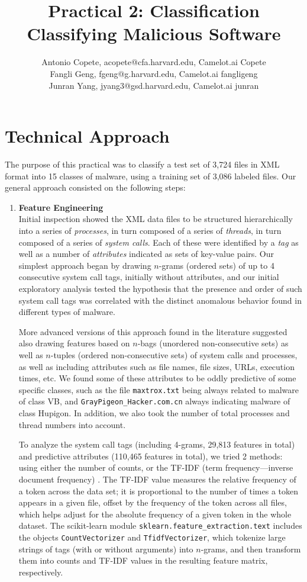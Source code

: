 \documentclass[11pt]{article}
\title{Practical 2: Classification\\ Classifying Malicious Software}
\author{Antonio Copete, acopete@cfa.harvard.edu, Camelot.ai Copete \\
	Fangli Geng, fgeng@g.harvard.edu, Camelot.ai fangligeng\\
	Junran Yang, jyang3@gsd.harvard.edu, Camelot.ai junran}
\begin{document}
\maketitle{}

\section{Technical Approach}

The purpose of this practical was to classify a test set of 3,724 files in XML format into 15 classes of malware, using a training set of 3,086 labeled files. Our general approach consisted on the following steps:

\begin{enumerate} %

\item \textbf{Feature Engineering}\\
Initial inspection showed the XML data files to be structured hierarchically into a series of \emph{processes}, in turn composed of a series of \emph{threads}, in turn composed of a series of \emph{system calls}. Each of these were identified by a \emph{tag} as well as a number of \emph{attributes} indicated as sets of key-value pairs. Our simplest approach began by drawing $n$-grams (ordered sets) of up to 4 consecutive system call tags, initially without attributes, and our initial exploratory analysis tested the hypothesis that the presence and order of such system call tags was correlated with the distinct anomalous behavior found in different types of malware.

More advanced versions of this approach found in the literature \cite{canali} suggested also drawing features based on $n$-bags (unordered non-consecutive sets) as well as $n$-tuples (ordered non-consecutive sets) of system calls and processes, as well as including attributes such as file names, file sizes, URLs, execution times, etc. We found some of these attributes to be oddly predictive of some specific classes, such as the file \verb|maxtrox.txt| being always related to malware of class VB, and \verb|GrayPigeon_Hacker.com.cn| always indicating malware of class Hupigon. In addition, we also took the number of total processes and thread numbers into account.

To analyze the system call tags (including 4-grams, 29,813 features in total) and predictive attributes (110,465 features in total), we tried 2 methods: using either the number of counts, or the TF-IDF (term frequency---inverse document frequency) \cite{canzanese}. The TF-IDF value measures the relative frequency of a token across the data set; it is proportional to the number of times a token appears in a given file, offset by the frequency of the token across all files, which helps adjust for the absolute frequency of a given token in the whole dataset. The scikit-learn module \verb|sklearn.feature_extraction.text| includes the objects \verb|CountVectorizer| and \verb|TfidfVectorizer|, which tokenize large strings of tags (with or without arguments) into $n$-grams, and then transform them into counts and TF-IDF values in the resulting feature matrix, respectively.



\end{enumerate}
\end{document}
